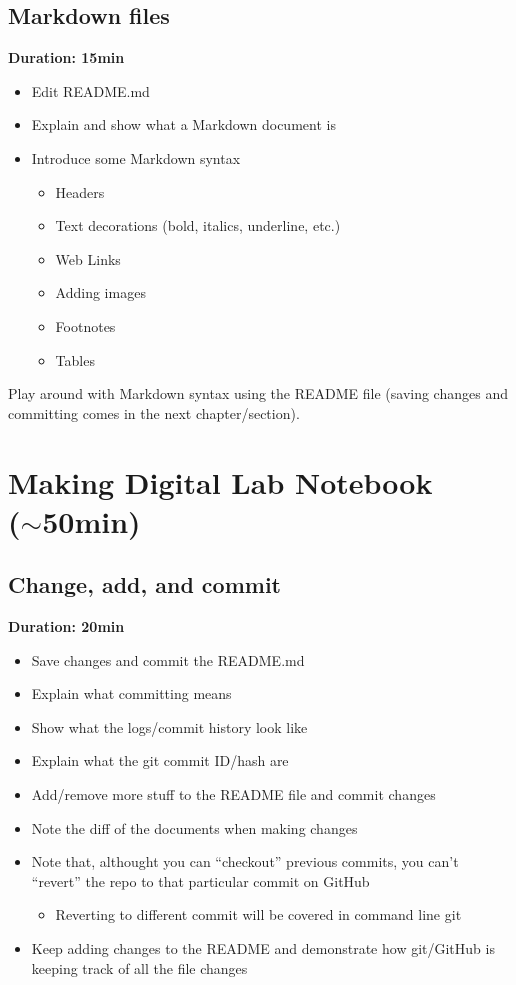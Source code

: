 \documentclass[a4paper, 12pt, oneside]{report} %
\begin{document}
\section{Markdown files}
\label{sec:markdown_files}

{\bfseries Duration: 15min}

\begin{itemize}
	\item Edit README.md
	\item Explain and show what a Markdown document is
	\item Introduce some Markdown syntax
		\begin{itemize}
			\item Headers
			\item Text decorations (bold, italics, underline, etc.)
			\item Web Links
			\item Adding images
			\item Footnotes
			\item Tables
		\end{itemize}
\end{itemize}

\noindent
Play around with Markdown syntax using the README file (saving changes and committing comes in the next chapter/section).


\chapter{Making Digital Lab Notebook\\($\sim$50min)}
\label{cha:making_digital_lab_notebook}

\section{Change, add, and commit}
\label{sec:change_add_and_commit}

{\bfseries Duration: 20min}

\begin{itemize}
	\item Save changes and commit the README.md
	\item Explain what committing means
	\item Show what the logs/commit history look like
	\item Explain what the git commit ID/hash are
	\item Add/remove more stuff to the README file and commit changes
	\item Note the diff of the documents when making changes
	\item Note that, althought you can ``checkout'' previous commits, you can't ``revert'' the repo to that particular commit on GitHub
		\begin{itemize}
			\item Reverting to different commit will be covered in command line git
		\end{itemize}
	\item Keep adding changes to the README and demonstrate how git/GitHub is keeping track of all the file changes
\end{itemize}
\end{document}
